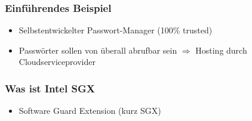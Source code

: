 \begin{frame}
    \frametitle{Einführendes Beispiel}
    \begin{itemize}
        \item Selbstentwickelter Passwort-Manager (100\% trusted)
        \item Passwörter sollen von überall abrufbar sein $\Rightarrow$ Hosting durch Cloudserviceprovider
    \end{itemize}
    \centering
\end{frame}

\begin{frame}
    \frametitle{Was ist Intel SGX}
    \begin{itemize}
        \item Software Guard Extension (kurz SGX)
    \end{itemize}
\end{frame}